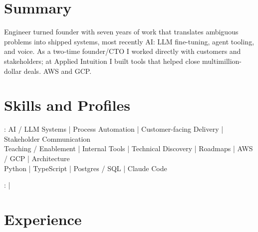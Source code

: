 \documentclass[print]{jack-resume}
\begin{document}
\pagecolor{darkmodeBackground}


\begin{minipage}[t][1cm][t]{.03\textwidth}
    \hfill
\end{minipage}

\section{Summary}
Engineer turned founder with seven years of work that translates ambiguous problems into shipped systems, most recently AI: LLM fine-tuning, agent tooling, and voice. As a two-time founder/CTO I worked directly with customers and stakeholders; at Applied Intuition I built tools that helped close multimillion-dollar deals. AWS and GCP.
\sectionsep

\section{Skills and Profiles}
:
AI / LLM Systems \hfill | \hfill
Process Automation \hfill | \hfill
Customer-facing Delivery \hfill | \hfill
Stakeholder Communication \\
\hspace{1.0cm} Teaching / Enablement \hfill | \hfill
Internal Tools \hfill | \hfill
Technical Discovery \hfill | \hfill
Roadmaps \hfill | \hfill
AWS / GCP \hfill | \hfill
Architecture \\
\hspace{1.0cm} Python \hfill | \hfill
TypeScript \hfill | \hfill
Postgres / SQL \hfill | \hfill
Claude Code \\

\raggedright{
    :
      \href{https://www.linkedin.com/in/jack-sturtevant/}{ \ExternalLink} |
     \href{https://github.com/jacksturt}{ \ExternalLink}}

\section{Experience}
\end{document}
